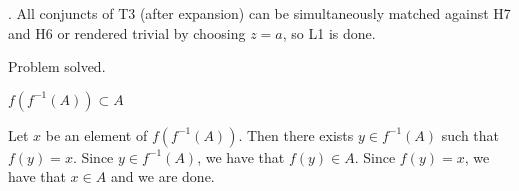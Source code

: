 \documentclass[a4paper,twoside,12pt]{article}
\makeatletter
\DeclareRobustCommand{\_}{%
  \leavevmode\vbox{%
    \hrule\@width.4em
          \@height-.16ex
          \@depth\dimexpr.16ex+.28pt\relax}}
\newenvironment{fit}{\begin{adjustbox}{max width=\textwidth,max totalheight=\textheight,keepaspectratio}}{\end{adjustbox}}
\makeatother
\begin{document}
\begin{steps}
. All conjuncts of T3 (after expansion) can be simultaneously matched against H7 and H6 or rendered trivial by choosing $z = a$, so L1 is done.\nopagebreak[4] 
\nopagebreak[4] 
\smallskip\nopagebreak[4] 

\begin{fit}%
\end{fit}

Problem solved.
\cleardoublepage

\end{steps}
{\begin{center} \large \textbf{$f(f^{-1}(A))\subset A$}\end{center}}\nopagebreak[4]

\begin{center}
\begin{minipage}{120mm}
Let $x$ be an element of $f(f^{-1}(A))$. Then there exists $y\in f^{-1}(A)$ such that $f(y) = x$. Since $y\in f^{-1}(A)$, we have that $f(y)\in A$. Since $f(y) = x$, we have that $x\in A$ and we are done.
\end{minipage}
\end{center}
\end{document}
